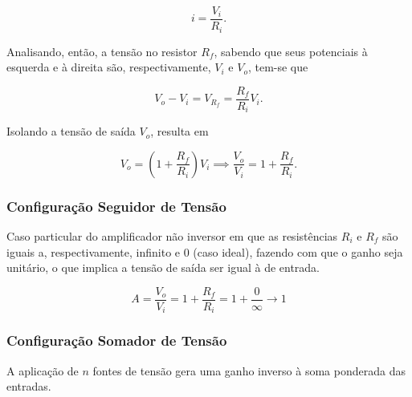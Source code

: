 \documentclass{article}
\numberwithin{equation}{section}
\let\dfr\dfrac
\begin{document}
\begin{equation*}
    i = \dfr{V_i}{R_i}.
\end{equation*}

\noindent Analisando, então, a tensão no resistor $R_f$, sabendo que seus potenciais à esquerda e à direita são, respectivamente, $V_i$ e $V_o$, tem-se que

\begin{equation*}
    V_o - V_i = V_{R_f} = \dfr{R_f}{R_i} V_i.
\end{equation*}

\noindent Isolando a tensão de saída $V_o$, resulta em

\begin{equation*}
    V_o = \left(1+\dfr{R_f}{R_i}\right) V_i \implies \dfr{V_o}{V_i} = 1+\dfr{R_f}{R_i}.
\end{equation*}

\subsubsection{Configuração Seguidor de Tensão}
Caso particular do amplificador não inversor em que as resistências $R_{i}$ e $R_{f}$ são iguais a, respectivamente, infinito e $0$ (caso ideal), fazendo com que o ganho seja unitário, o que implica a tensão de saída ser igual à de entrada.

\begin{center}
\end{center}

\begin{equation}
    A=\frac{V_{o}}{V_{i}}=1+\frac{R_{f}}{R_{i}}=1+\frac{0}{\infty}\xrightarrow{}1
\end{equation}

\subsubsection{Configuração Somador de Tensão}
A aplicação de $n$ fontes de tensão gera uma ganho inverso à soma ponderada das entradas.
\end{document}
